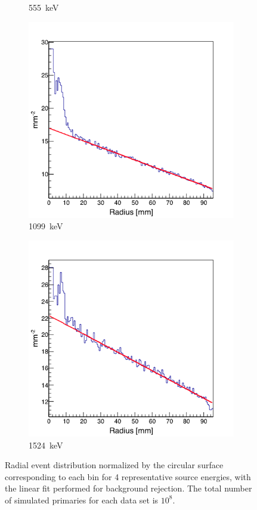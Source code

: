 \begin{figure}
\begin{subfigure}[b]{.5\textwidth}
  \caption{555~keV}
  \label{fig:rad_distr_fit_555keV}
\end{subfigure}
\begin{subfigure}[b]{.5\textwidth}
  \centering
  \includegraphics[width=.9\linewidth]{03_GraphicFiles/chapter5_SPECTsimu/SPECT/anger/radial_distr/fit_1099keV}
  \caption{1099~keV}
  \label{fig:rad_distr_fit_1099keV}
\end{subfigure}
\begin{subfigure}[b]{.5\textwidth}
  \centering
  \includegraphics[width=.9\linewidth]{03_GraphicFiles/chapter5_SPECTsimu/SPECT/anger/radial_distr/fit_1524keV}
  \caption{1524~keV}
  \label{fig:rad_distr_fit_1524keV}
\end{subfigure}
\caption{Radial event distribution normalized by the circular surface corresponding to each bin for 4 representative source energies, with the linear fit performed for background rejection. The total number of simulated primaries for each data set is $\mathrm{10^{8}}$.}
\label{chap5::fig::distr_with_fit}
\end{figure}

